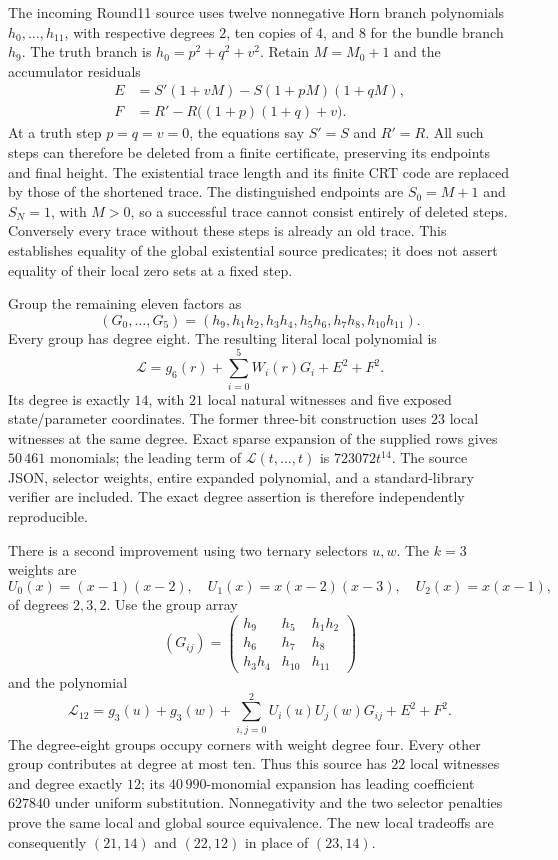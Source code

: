 The incoming Round11 source uses twelve nonnegative Horn branch
polynomials $h_0,\ldots,h_{11}$, with respective degrees $2$, ten
copies of $4$, and $8$ for the bundle branch $h_9$.  The truth branch is
$h_0=p^2+q^2+v^2$.  Retain $M=M_0+1$ and the accumulator residuals
\begin{align*}
 E&=S'(1+vM)-S(1+pM)(1+qM),\\
 F&=R'-R\bigl((1+p)(1+q)+v\bigr).
\end{align*}
At a truth step $p=q=v=0$, the equations say $S'=S$ and $R'=R$.
All such steps can therefore be deleted from a finite certificate,
preserving its endpoints and final height.  The existential trace length
and its finite CRT code are replaced by those of the shortened trace.
The distinguished endpoints are $S_0=M+1$ and $S_N=1$, with $M>0$, so a successful trace cannot consist entirely of deleted steps. Conversely every trace without these steps is already an old trace.
This establishes equality of the global existential source predicates;
it does not assert equality of their local zero sets at a fixed step.

Group the remaining eleven factors as
\[
 (G_0,\ldots,G_5)=
 (h_9,h_1h_2,h_3h_4,h_5h_6,h_7h_8,h_{10}h_{11}).
\]
Every group has degree eight.  The resulting literal local polynomial is
\[
 \mathcal L=g_6(r)+\sum_{i=0}^{5}W_i(r)G_i+E^2+F^2.
\]
Its degree is exactly $14$, with $21$ local natural witnesses and five
exposed state/parameter coordinates.  The former three-bit construction
uses $23$ local witnesses at the same degree.  Exact sparse expansion of
the supplied rows gives $50\,461$ monomials; the leading term of
$\mathcal L(t,\ldots,t)$ is $723072t^{14}$.  The source JSON, selector
weights, entire expanded polynomial, and a standard-library verifier are
included.  The exact degree assertion is therefore independently
reproducible.

There is a second improvement using two ternary selectors $u,w$.  The
$k=3$ weights are
\[
 U_0(x)=(x-1)(x-2),\quad
 U_1(x)=x(x-2)(x-3),\quad
 U_2(x)=x(x-1),
\]
of degrees $2,3,2$.  Use the group array
\[
 (G_{ij})=
 \begin{pmatrix}
 h_9&h_5&h_1h_2\\
 h_6&h_7&h_8\\
 h_3h_4&h_{10}&h_{11}
 \end{pmatrix}
\]
and the polynomial
\[
 \mathcal L_{12}=g_3(u)+g_3(w)
 +\sum_{i,j=0}^{2}U_i(u)U_j(w)G_{ij}+E^2+F^2.
\]
The degree-eight groups occupy corners with weight degree four.  Every
other group contributes at degree at most ten.  Thus this source has
$22$ local witnesses and degree exactly $12$; its $40\,990$-monomial
expansion has leading coefficient $627840$ under uniform substitution.
Nonnegativity and the two selector penalties prove the same local and
global source equivalence.  The new local tradeoffs are consequently
$(21,14)$ and $(22,12)$ in place of $(23,14)$.

